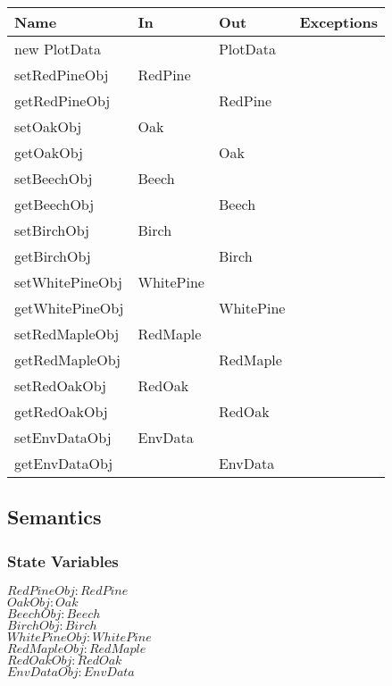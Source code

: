 \documentclass[12pt, titlepage]{article}
\begin{document}
\begin{center}
\begin{tabular}{|l|l|l| p{5cm}|}
\hline
\textbf{Name} & \textbf{In} & \textbf{Out} & \textbf{Exceptions} \\
\hline
new PlotData & & PlotData & \\
\hline

setRedPineObj & RedPine  & & \\
\hline
getRedPineObj & & RedPine & \\
\hline

setOakObj & Oak  & & \\
\hline
getOakObj & & Oak & \\
\hline

setBeechObj & Beech  & & \\
\hline
getBeechObj & & Beech & \\
\hline

setBirchObj & Birch  & & \\
\hline
getBirchObj & & Birch & \\
\hline

setWhitePineObj & WhitePine  & & \\
\hline
getWhitePineObj & & WhitePine & \\
\hline

setRedMapleObj & RedMaple  & & \\
\hline
getRedMapleObj & & RedMaple & \\
\hline

setRedOakObj & RedOak  & & \\
\hline
getRedOakObj & & RedOak & \\
\hline

setEnvDataObj & EnvData  & & \\
\hline
getEnvDataObj & & EnvData & \\
\hline

\end{tabular}
\end{center}

\newpage

\subsection{Semantics}

\subsubsection{State Variables}
$\mathit{RedPineObj: RedPine}$\\
$\mathit{OakObj: Oak}$\\
$\mathit{BeechObj: Beech}$\\
\renewcommand{\attr}{Birch}
$\mathit{\attr Obj: \attr}$\\
\renewcommand{\attr}{WhitePine}
$\mathit{\attr Obj: \attr}$\\
\renewcommand{\attr}{RedMaple}
$\mathit{\attr Obj: \attr}$\\
\renewcommand{\attr}{RedOak}
$\mathit{\attr Obj: \attr}$\\
\renewcommand{\attr}{EnvData}
$\mathit{\attr Obj: \attr}$\\
\end{document}

